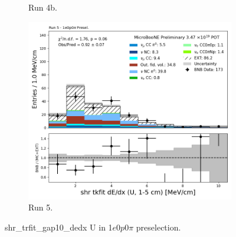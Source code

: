 \begin{figure}[H]
\begin{subfigure}[t]{0.32\linewidth}
        \caption{Run 4b.}
    \end{subfigure}%
    \hspace{0.2cm}%
    \begin{subfigure}[t]{0.32\linewidth}
        \includegraphics[width=\linewidth]{technote/Appendix_Preselection/Figures/1e0p0pi/Run5/shr_tkfit_gap10_dedx_U_Run5_1e0p0pi_Presel.png}
        \caption{Run 5.}
    \end{subfigure}
    \caption{shr\_trfit\_gap10\_dedx U in 1$e$0$p$0$\pi$ preselection.}
\end{figure}

